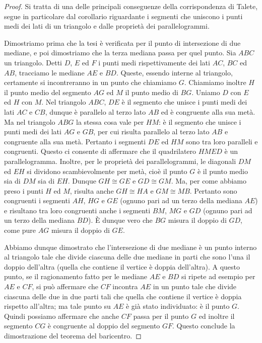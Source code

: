 \begin{proof}
Si tratta di una delle principali conseguenze della corrispondenza di 
Talete, segue in particolare dal corollario riguardante i segmenti 
che uniscono i punti medi dei lati di un triangolo e dalle proprietà 
dei parallelogrammi.

Dimostriamo prima che la tesi è verificata per il punto di 
intersezione di due mediane, e poi dimostriamo che la terza mediana 
passa per quel punto.
Sia $ABC$ un triangolo. Detti $D$, $E$ ed $F$ i punti medi 
rispettivamente dei lati $AC$, $BC$ ed $AB$, tracciamo le mediane 
$AE$ e $BD$. Queste, essendo interne al triangolo, certamente si 
incontreranno in un punto che chiamiamo $G$. Chiamiamo inoltre $H$ il 
punto medio del segmento $AG$ ed $M$ il punto medio di $BG$. Uniamo 
$D$ con $E$ ed $H$ con $M$. Nel triangolo $ABC$, $DE$ è il segmento 
che unisce i punti medi dei lati $AC$ e $CB$, dunque è parallelo al 
terzo lato $AB$ ed è congruente alla sua metà. Ma nel triangolo $ABG$ 
la stessa cosa vale per $HM$: è il segmento che unisce i punti medi 
dei lati $AG$ e $GB$, per cui risulta parallelo al terzo lato $AB$ e 
congruente alla sua metà. Pertanto i segmenti $DE$ ed $HM$ sono tra 
loro paralleli e congruenti. Questo ci consente di affermare che il 
quadrilatero $HMED$ è un parallelogramma. Inoltre, per le proprietà 
dei parallelogrammi, le diagonali $DM$ ed $EH$ si dividono 
scambievolmente per metà, cioè il punto $G$ è il punto medio sia di 
$DM$ sia di $EH$. Dunque $GH\cong GE$ e $GD\cong GM$. Ma, per come 
abbiamo preso i punti $H$ ed $M$, risulta anche $GH\cong HA$ e 
$GM\cong MB$. Pertanto sono congruenti i segmenti $AH$, $HG$ e $GE$ 
(ognuno pari ad un terzo della mediana $AE$) e risultano tra loro 
congruenti anche i segmenti $BM$, $MG$ e $GD$ (ognuno pari ad un 
terzo della mediana $BD$). \`E dunque vero che $BG$ misura il doppio 
di $GD$, come pure $AG$ misura il doppio di $GE$.

Abbiamo dunque dimostrato che l'intersezione di due mediane è un 
punto interno al triangolo tale che divide ciascuna delle due mediane 
in parti che sono l'una il doppio dell'altra (quella che contiene il 
vertice è doppia dell'altra).
A questo punto, se il ragionamento fatto per le mediane $AE$ e $BD$ 
si ripete ad esempio per $AE$ e $CF$, si può affermare che $CF$ 
incontra $AE$ in un punto tale che divide ciascuna delle due in due 
parti tali che quella che contiene il vertice è doppia rispetto 
all'altra; ma tale punto su $AE$ è già stato individuato: è il punto 
$G$. Quindi possiamo affermare che anche $CF$ passa per il punto $G$ 
ed inoltre il segmento $CG$ è congruente al doppio del segmento $GF$. 
Questo conclude la dimostrazione del teorema del baricentro.
\end{proof}

